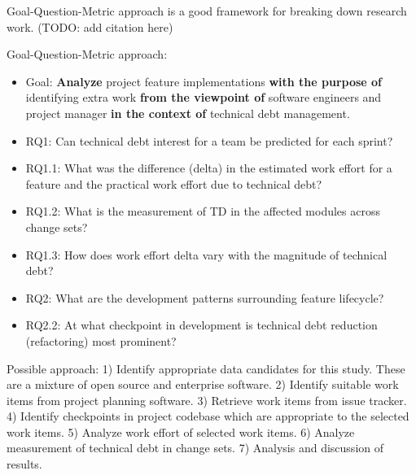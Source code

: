 \documentclass{mprop}
\begin{document}
Goal-Question-Metric approach is a good framework for breaking down research
work. (TODO: add citation here)

Goal-Question-Metric approach:
\begin{itemize}
	\item Goal: \textbf{Analyze} project feature implementations \textbf{with
	the purpose of} identifying extra work \textbf{from the viewpoint of}
	software engineers and project manager \textbf{in the context of}
	technical debt management.
	\item RQ1: Can technical debt interest for a team be predicted for each
	sprint?
	\item RQ1.1: What was the difference (delta) in the estimated work effort
	for a feature and the practical work effort due to technical debt?
	\item RQ1.2: What is the measurement of TD in the affected modules across
	change sets?
	\item RQ1.3: How does work effort delta vary with the magnitude of
	technical debt?
	\item RQ2: What are the development patterns surrounding feature
	lifecycle?
	\item RQ2.2: At what checkpoint in development is technical debt reduction
	(refactoring)  most prominent?
\end{itemize}

Possible approach: 1) Identify appropriate data candidates for this study. These
are a mixture of open source and enterprise software. 2) Identify suitable work
items from project planning software. 3) Retrieve work items from issue tracker.
4) Identify checkpoints in project codebase which are appropriate to the
selected work items. 5) Analyze work effort of selected work items. 6) Analyze
measurement of technical debt in change sets. 7) Analysis and discussion of
results.
\end{document}
